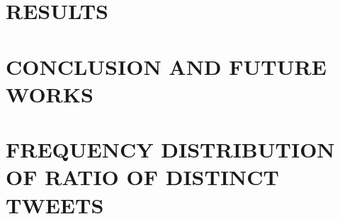 \documentclass[BTech]{iitddiss}
\newcommand{\eat}[1]{}
\begin{document}
\chapter{RESULTS}
\label{chap:results}


\chapter{CONCLUSION AND FUTURE WORKS}
\label{chap:future-works}









\appendix

% 

\chapter{FREQUENCY DISTRIBUTION OF RATIO OF DISTINCT TWEETS}
\label{chap:distinct-tweets-ratio}


% 



\begin{singlespace}
  
\end{singlespace}


\eat{%

\listofpapers

\begin{enumerate}
\item Authors....  \newblock
 Title...
  \newblock {\em Journal}, Volume,
  Page, (year).
\end{enumerate}}
\end{document}
